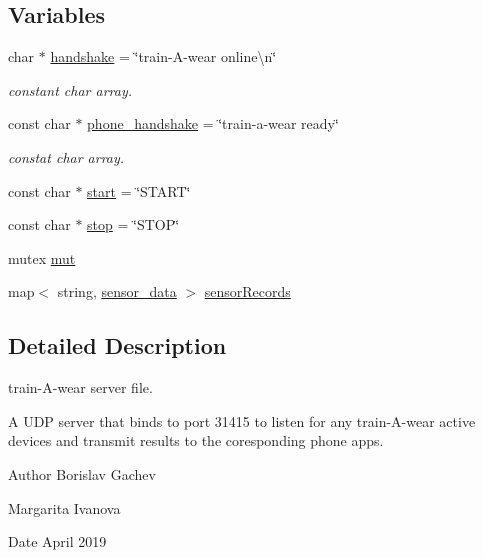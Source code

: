 \subsection*{Variables}
\begin{DoxyCompactItemize}
\item 
char $\ast$ \mbox{\hyperlink{train-_a-wear__server_8cpp_a0f2faa14b725237d13bb7d2e8b7e3942}{handshake}} = \char`\"{}train-\/A-\/wear online\textbackslash{}n\char`\"{}
\begin{DoxyCompactList}\small\item\em constant char array. \end{DoxyCompactList}\item 
const char $\ast$ \mbox{\hyperlink{train-_a-wear__server_8cpp_aba845a1aa2054e7dadd0653a67b549f4}{phone\+\_\+handshake}} = \char`\"{}train-\/a-\/wear ready\char`\"{}
\begin{DoxyCompactList}\small\item\em constat char array. \end{DoxyCompactList}\item 
const char $\ast$ \mbox{\hyperlink{train-_a-wear__server_8cpp_ac621bcfb466f3b6a6421c5f48b30ade3}{start}} = \char`\"{}S\+T\+A\+RT\char`\"{}
\item 
const char $\ast$ \mbox{\hyperlink{train-_a-wear__server_8cpp_a94c0a5a6a2bfcdd03883cd7d72bbaa86}{stop}} = \char`\"{}S\+T\+OP\char`\"{}
\item 
mutex \mbox{\hyperlink{train-_a-wear__server_8cpp_a8068724ec29d6e66aad75c716e138db3}{mut}}
\item 
map$<$ string, \mbox{\hyperlink{structsensor__data}{sensor\+\_\+data}} $>$ \mbox{\hyperlink{train-_a-wear__server_8cpp_ac46b8bbbac4148e54db22486817eb63d}{sensor\+Records}}
\end{DoxyCompactItemize}


\subsection{Detailed Description}
train-\/\+A-\/wear server file. 

A U\+DP server that binds to port 31415 to listen for any train-\/\+A-\/wear active devices and transmit results to the coresponding phone apps.

\begin{DoxyAuthor}{Author}
Borislav Gachev 

Margarita Ivanova
\end{DoxyAuthor}
\begin{DoxyDate}{Date}
April 2019 
\end{DoxyDate}


